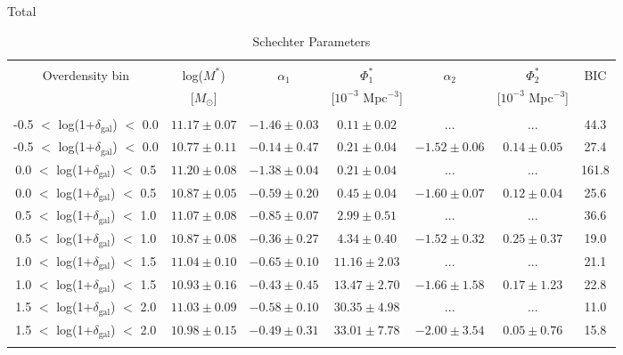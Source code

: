 \documentclass[a4paper,fleqn,usenatbib]{mnras}
\begin{document}

\begin{table*}
	\begin{center}
	\caption{Schechter Parameters}
	\label{tab:params}

	Total \\[0.5mm]
	\begin{tabular}{ccccccc}

	\hline \\[-5mm]
	\hline \\[-3mm]

	Overdensity bin & log($M^*$) & $\alpha_1$ & $\Phi^*_1$ & $\alpha_2$ & $\Phi^*_2$ & BIC \\
	 & [$M_{\odot}$] & & [$10^{-3}$ Mpc$^{-3}$] & & [$10^{-3}$ Mpc$^{-3}$] \\
	\hline \\[-2mm]

    -0.5 $<$ log(1+$\delta_{\mathrm{gal}}$) $<$ 0.0 & $11.17\pm0.07$ & $-1.46\pm0.03$ & $ 0.11\pm0.02$ & ... & ... & 44.3  \\
    -0.5 $<$ log(1+$\delta_{\mathrm{gal}}$) $<$ 0.0 & $10.77\pm0.11$ & $-0.14\pm0.47$ & $ 0.21\pm0.04$ & $-1.52\pm0.06$ & $ 0.14\pm0.05$ & 27.4  \\[-0.5mm]
    \hline
    0.0 $<$ log(1+$\delta_{\mathrm{gal}}$) $<$ 0.5 & $11.20\pm0.08$ & $-1.38\pm0.04$ & $ 0.21\pm0.04$ & ... & ...  & 161.8  \\
    0.0 $<$ log(1+$\delta_{\mathrm{gal}}$) $<$ 0.5 & $10.87\pm0.05$ & $-0.59\pm0.20$ & $ 0.45\pm0.04$ & $-1.60\pm0.07$ & $ 0.12\pm0.04$ & 25.6  \\[-0.5mm]
    \hline
    0.5 $<$ log(1+$\delta_{\mathrm{gal}}$) $<$ 1.0 & $11.07\pm0.08$ & $-0.85\pm0.07$ & $ 2.99\pm0.51$ & ... & ... & 36.6  \\
    0.5 $<$ log(1+$\delta_{\mathrm{gal}}$) $<$ 1.0 & $10.87\pm0.08$ & $-0.36\pm0.27$ & $ 4.34\pm0.40$ & $-1.52\pm0.32$ & $ 0.25\pm0.37$ & 19.0  \\[-0.5mm]
    \hline
    1.0 $<$ log(1+$\delta_{\mathrm{gal}}$) $<$ 1.5 & $11.04\pm0.10$ & $-0.65\pm0.10$ & $11.16\pm2.03$ & ... & ... & 21.1  \\
    1.0 $<$ log(1+$\delta_{\mathrm{gal}}$) $<$ 1.5 & $10.93\pm0.16$ & $-0.43\pm0.45$ & $13.47\pm2.70$ & $-1.66\pm1.58$ & $ 0.17\pm1.23$ & 22.8  \\[-0.5mm]
    \hline
    1.5 $<$ log(1+$\delta_{\mathrm{gal}}$) $<$ 2.0 & $11.03\pm0.09$ & $-0.58\pm0.10$ & $30.35\pm4.98$ & ... & ... & 11.0  \\
    1.5 $<$ log(1+$\delta_{\mathrm{gal}}$) $<$ 2.0 & $10.98\pm0.15$ & $-0.49\pm0.31$ & $33.01\pm7.78$ & $-2.00\pm3.54$ & $ 0.05\pm0.76$ & 15.8  \\[-0.5mm]
	\hline \\[-2.5mm]



\end{tabular}
\end{center}
\end{table*}
\end{document}
